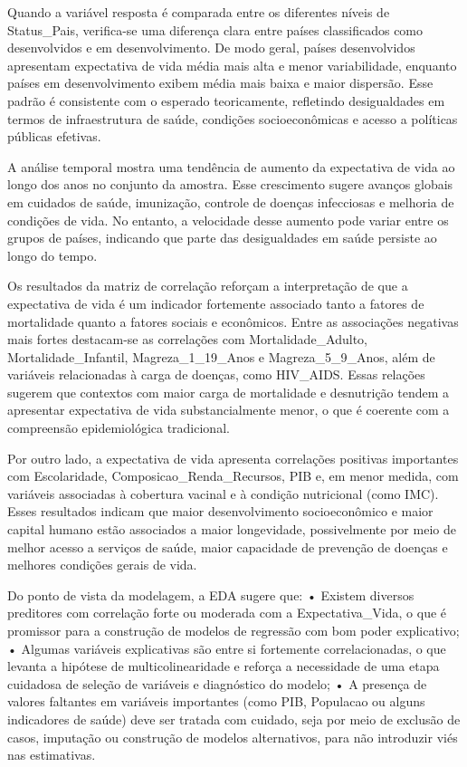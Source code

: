 \documentclass[
  12pt,
]{article}
\begin{document}
Quando a variável resposta é comparada entre os diferentes níveis de
Status\_Pais, verifica-se uma diferença clara entre países classificados
como desenvolvidos e em desenvolvimento. De modo geral, países
desenvolvidos apresentam expectativa de vida média mais alta e menor
variabilidade, enquanto países em desenvolvimento exibem média mais
baixa e maior dispersão. Esse padrão é consistente com o esperado
teoricamente, refletindo desigualdades em termos de infraestrutura de
saúde, condições socioeconômicas e acesso a políticas públicas efetivas.

A análise temporal mostra uma tendência de aumento da expectativa de
vida ao longo dos anos no conjunto da amostra. Esse crescimento sugere
avanços globais em cuidados de saúde, imunização, controle de doenças
infecciosas e melhoria de condições de vida. No entanto, a velocidade
desse aumento pode variar entre os grupos de países, indicando que parte
das desigualdades em saúde persiste ao longo do tempo.

Os resultados da matriz de correlação reforçam a interpretação de que a
expectativa de vida é um indicador fortemente associado tanto a fatores
de mortalidade quanto a fatores sociais e econômicos. Entre as
associações negativas mais fortes destacam-se as correlações com
Mortalidade\_Adulto, Mortalidade\_Infantil, Magreza\_1\_19\_Anos e
Magreza\_5\_9\_Anos, além de variáveis relacionadas à carga de doenças,
como HIV\_AIDS. Essas relações sugerem que contextos com maior carga de
mortalidade e desnutrição tendem a apresentar expectativa de vida
substancialmente menor, o que é coerente com a compreensão
epidemiológica tradicional.

Por outro lado, a expectativa de vida apresenta correlações positivas
importantes com Escolaridade, Composicao\_Renda\_Recursos, PIB e, em
menor medida, com variáveis associadas à cobertura vacinal e à condição
nutricional (como IMC). Esses resultados indicam que maior
desenvolvimento socioeconômico e maior capital humano estão associados a
maior longevidade, possivelmente por meio de melhor acesso a serviços de
saúde, maior capacidade de prevenção de doenças e melhores condições
gerais de vida.

Do ponto de vista da modelagem, a EDA sugere que: • Existem diversos
preditores com correlação forte ou moderada com a Expectativa\_Vida, o
que é promissor para a construção de modelos de regressão com bom poder
explicativo; • Algumas variáveis explicativas são entre si fortemente
correlacionadas, o que levanta a hipótese de multicolinearidade e
reforça a necessidade de uma etapa cuidadosa de seleção de variáveis e
diagnóstico do modelo; • A presença de valores faltantes em variáveis
importantes (como PIB, Populacao ou alguns indicadores de saúde) deve
ser tratada com cuidado, seja por meio de exclusão de casos, imputação
ou construção de modelos alternativos, para não introduzir viés nas
estimativas.
\end{document}
